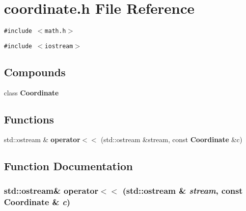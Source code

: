 \section{coordinate.h File Reference}
\label{coordinate_8h}
{\tt \#include $<$math.h$>$}\par
{\tt \#include $<$iostream$>$}\par
\subsection*{Compounds}
\begin{CompactItemize}
\item 
class {\bf Coordinate}
\end{CompactItemize}
\subsection*{Functions}
\begin{CompactItemize}
\item 
std::ostream \& {\bf operator$<$$<$} (std::ostream \&stream, const {\bf Coordinate} \&c)
\end{CompactItemize}


\subsection{Function Documentation}
\subsubsection{\setlength{\rightskip}{0pt plus 5cm}std::ostream\& operator$<$$<$ (std::ostream \& {\em stream}, const {\bf Coordinate} \& {\em c})\hspace{0.3cm}{\tt  [inline]}}\label{coordinate_8h_a0}


